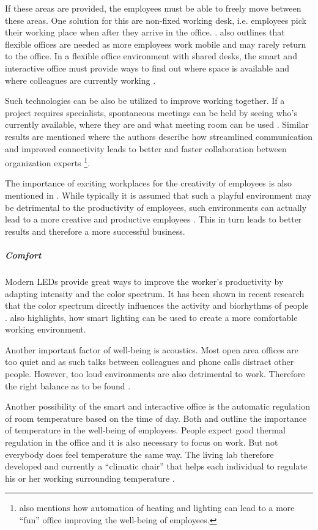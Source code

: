 If these areas are provided, the employees must be able to freely move between these areas. One solution for this are non-fixed working desk, i.e. employees pick their working place when after they arrive in the office. \cite{occupiee}.  also outlines that flexible offices are needed as more employees work mobile and may rarely return to the office. In a flexible office environment with shared desks, the smart and interactive office must provide ways to find out where space is available and where colleagues are currently working \cite{tieto}.

Such technologies can be also be utilized to improve working together. If a project requires specialists, spontaneous meetings can be held by seeing who's currently available, where they are and what meeting room can be used \cite{tieto}. Similar results are mentioned \cite{hbcommunications} where the authors describe how streamlined communication and improved connectivity leads to better and faster collaboration between organization experts \footnote{\cite{hbcommunications} also mentions how automation of heating and lighting can lead to a more ``fun'' office improving the well-being of employees.}.

The importance of exciting workplaces for the creativity of employees is also mentioned in \cite{roomzilla3}. While typically it is assumed that such a playful environment may be detrimental to the productivity of employees, such environments can actually lead to a more creative and productive employees \cite{metroffice}. This in turn leads to better results and therefore a more successful business.



\subparagraph{Comfort}\label{sec:sda-comfort}
Modern LEDs provide great ways to improve the worker's productivity by adapting intensity and the color spectrum. It has been shown in recent research that the color spectrum directly influences the activity and biorhythms of people  \cite{living-lab}. \cite{iotagenda} also highlights, how smart lighting can be used to create a more comfortable working environment.

Another important factor of well-being is acoustics. Most open area offices are too quiet and as such talks between colleagues and phone calls distract other people. However, too loud environments are also detrimental to work. Therefore the right balance as to be found \cite{living-lab}. 

Another possibility of the smart and interactive office is the automatic regulation of room temperature based on the time of day. Both \cite{iotagenda} and \cite{living-lab} outline the importance of temperature in the well-being of employees. People expect good thermal regulation in the office and it is also necessary to focus on work. But not everybody does feel temperature the same way. The living lab therefore developed and currently a ``climatic chair'' that helps each individual to regulate his or her working surrounding temperature \cite{living-lab}.


